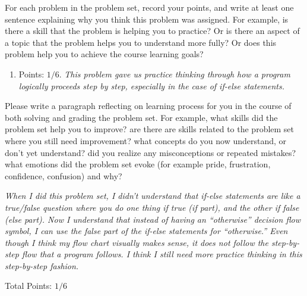 \documentclass[11pt]{article}
\begin{document}


\bigskip
For each problem in the problem set, record your points, and write at least one sentence explaining why you think this problem was assigned. For example, is there a skill that the problem is helping you to practice? Or is there an aspect of a topic that the problem helps you to understand more fully? Or does this problem help you to achieve the course learning goals?
\begin{enumerate}
\item Points: $1/6$. {\it This problem gave us practice thinking through how a program logically proceeds step by step, especially in the case of if-else statements. }


\vspace{1cm}
\end{enumerate}

\vfill
Please write a paragraph reflecting on learning process for you in the course of both solving and grading the problem set. For example, what skills did the problem set help you to improve? are there are skills related to the problem set where you still need improvement? what concepts do you now understand, or don't yet understand? did you realize any misconceptions or repeated mistakes? what emotions did the problem set evoke (for example pride, frustration, confidence, confusion) and why?

\vspace{1cm}
{\it When I did this problem set, I didn't understand that if-else statements are like a true/false question where you do one thing if true (if part), and the other if false (else part). Now I understand that instead of having an ``otherwise'' decision flow symbol, I can use the false part of the if-else statements for ``otherwise.'' Even though I think my flow chart visually makes sense, it does not follow the step-by-step flow that a program follows. I think I
still need more practice thinking in this step-by-step fashion.}

\vspace{1cm}
\noindent Total Points: $1/6$
\end{document}
